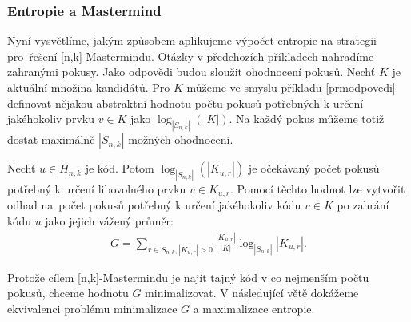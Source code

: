 \subsubsection{Entropie a Mastermind}
Nyní vysvětlíme, jakým způsobem aplikujeme výpočet entropie na strategii pro~řešení [n,k]-Mastermindu. Otázky v předchozích příkladech nahradíme zahranými pokusy. Jako odpovědi budou sloužit ohodnocení pokusů. Nechť $K$ je aktuální množina kandidátů. Pro $K$ můžeme ve smyslu příkladu \ref{prmodpovedi} definovat nějakou abstraktní hodnotu počtu pokusů potřebných k určení jakéhokoliv prvku  $v \in K$ jako $\log_{|S_{n,k}|}(|K|)$. Na každý pokus můžeme totiž dostat maximálně $|S_{n,k}|$ možných ohodnocení. 

Nechť $u \in H_{n,k}$ je kód. 
Potom $\log_{|S_{n,k}|}(|K_{u,r}|)$ je očekávaný počet pokusů potřebný k určení libovolného prvku $v \in K_{u,r}$. Pomocí těchto hodnot lze vytvořit odhad na~počet pokusů potřebný k určení jakéhokoliv kódu $v \in K$ po zahrání kódu $u$ jako jejich vážený průměr:
\begin{align}\label{rceocekavanypocetpokusu}
    G = \sum_{r\in S_{n,k}, |K_{u,r}| > 0} \frac{|K_{u,r}|}{|K|}\log_{|S_{n,k}|}|K_{u,r}|.
\end{align}



Protože cílem [n,k]-Mastermindu je najít tajný kód v co nejmenším počtu pokusů, chceme hodnotu $G$ minimalizovat. V následující větě dokážeme ekvivalenci problému minimalizace $G$ a maximalizace entropie. 


